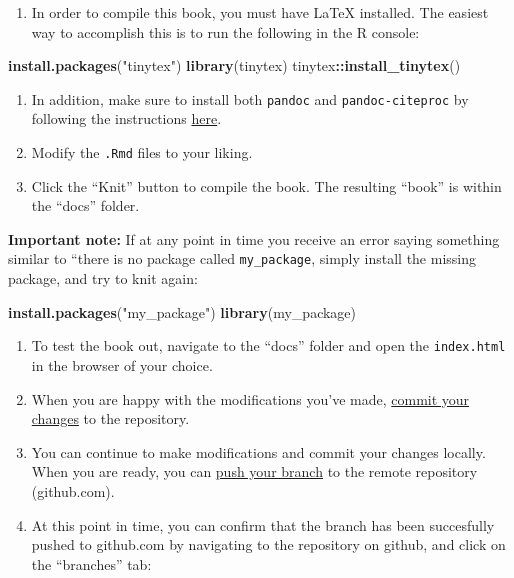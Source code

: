 \documentclass[]{book}
\newenvironment{Shaded}{\begin{snugshade}}{\end{snugshade}}
\newcommand{\KeywordTok}[1]{\textcolor[rgb]{0.13,0.29,0.53}{\textbf{#1}}}
\newcommand{\StringTok}[1]{\textcolor[rgb]{0.31,0.60,0.02}{#1}}
\newcommand{\OperatorTok}[1]{\textcolor[rgb]{0.81,0.36,0.00}{\textbf{#1}}}
\newcommand{\NormalTok}[1]{#1}
\providecommand{\tightlist}{%
  \setlength{\itemsep}{0pt}\setlength{\parskip}{0pt}}
\begin{document}
\begin{enumerate}
\def\labelenumi{\arabic{enumi}.}
\setcounter{enumi}{10}
\tightlist
\item
  In order to compile this book, you must have LaTeX installed. The
  easiest way to accomplish this is to run the following in the R
  console:
\end{enumerate}

\begin{Shaded}
\begin{Highlighting}[]
\KeywordTok{install.packages}\NormalTok{(}\StringTok{"tinytex"}\NormalTok{)}
\KeywordTok{library}\NormalTok{(tinytex)}
\NormalTok{tinytex}\OperatorTok{::}\KeywordTok{install_tinytex}\NormalTok{()}
\end{Highlighting}
\end{Shaded}

\begin{enumerate}
\def\labelenumi{\arabic{enumi}.}
\setcounter{enumi}{11}
\item
  In addition, make sure to install both \texttt{pandoc} and
  \texttt{pandoc-citeproc} by following the instructions
  \href{https://pandoc.org/installing.html}{here}.
\item
  Modify the \texttt{.Rmd} files to your liking.
\item
  Click the ``Knit'' button to compile the book. The resulting ``book''
  is within the ``docs'' folder.
\end{enumerate}

\textbf{Important note:} If at any point in time you receive an error
saying something similar to ``there is no package called
\texttt{my\_package}, simply install the missing package, and try to
knit again:

\begin{Shaded}
\begin{Highlighting}[]
\KeywordTok{install.packages}\NormalTok{(}\StringTok{"my_package"}\NormalTok{)}
\KeywordTok{library}\NormalTok{(my_package)}
\end{Highlighting}
\end{Shaded}

\begin{enumerate}
\def\labelenumi{\arabic{enumi}.}
\setcounter{enumi}{14}
\tightlist
\item
  To test the book out, navigate to the ``docs'' folder and open the
  \texttt{index.html} in the browser of your choice.
\item
  When you are happy with the modifications you've made,
  \protect\hyperlink{git-commit-changes}{commit your changes} to the
  repository.
\item
  You can continue to make modifications and commit your changes
  locally. When you are ready, you can
  \protect\hyperlink{git-push-local-commits}{push your branch} to the
  remote repository (github.com).
\item
  At this point in time, you can confirm that the branch has been
  succesfully pushed to github.com by navigating to the repository on
  github, and click on the ``branches'' tab:
\end{enumerate}
\end{document}
